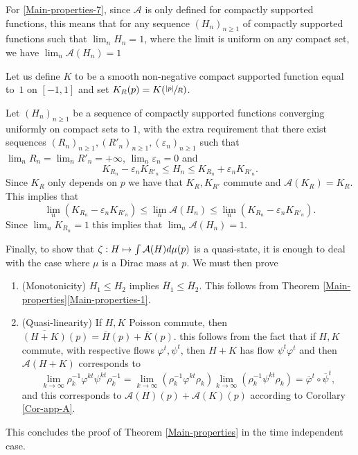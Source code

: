 \documentclass[JEP,XML,SOM,NoFloatCountersInSection,Unicode,published]{cedram}
\newcommand\mto{\mathchoice{\longmapsto}{\mapsto}{\mapsto}{\mapsto}}
\numberwithin{equation}{section}
\let \phi \varphi
\theoremstyle{plain}
\theoremstyle{definition}
\theoremstyle{remark}
\begin{document}
For \eqref{Main-properties-7}, since $\mathcal A$ is only defined for compactly supported functions, this means
that for any sequence $(H_n)_{n\geq 1}$ of compactly supported functions such that $\lim_n H_n=1$, where the limit is uniform on any compact set, we have $\lim_n \mathcal A (H_n)=1$

Let us define $K$ to be a smooth non-negative compact supported function equal to~$1$ on $[-1,1]$ and set $K_R(p)=K(\sfrac{ \vert p \vert }{R})$.

Let $(H_n)_{n\geq 1}$ be a sequence of compactly supported functions converging uniformly on compact sets to $1$, with the extra requirement that there exist sequences $(R_{n})_{n\geq 1}, (R'_{n})_{n\geq 1}, (\varepsilon_{n})_{n\geq 1}$ such that $\lim_{n}R_{n}=\lim_{n}R'_{n}=+\infty$, $\lim_{n} \varepsilon _{n}=0$ and
\[
K_{R_{n}}- \varepsilon_n K_{R'_{n}} \leq H_n \leq K_{R_n}+ \varepsilon_{n}K_{R'_{n}}.
\]
Since $K_R$ only depends on $p$ we have that $K_R,K_{R'}$ commute and ${\mathcal A}(K_R)=K_R$. This implies
that
\[
\lim_n(K_{R_n}- \varepsilon_nK_{R'_n})\leq \lim_n{\mathcal A}(H_n) \leq \lim_n(K_{R_n}- \varepsilon_nK_{R'_n}).
\]
Since $\lim_n K_{R_n}=1$ this implies that $\lim_n{\mathcal A}(H_n)=1$.

Finally, to show that $\zeta: H \mto \int \mathcal A (H) d\mu(p)$ is a quasi-state, it is enough to deal with the case where $\mu$ is a Dirac mass at $p$. We must then prove

\begin{enumerate}
\item (Monotonicity) $H_{1}\leq H_{2}$ implies $\overline H_{1} \leq \overline H_{2}$. This follows from Theorem \ref{Main-properties}\ref{Main-properties-1}.

\item (Quasi-linearity) If $H,K$ Poisson commute, then $\overline {(H+K)}(p)=\overline H (p) + \overline K(p)$. this follows from the fact that if $H,K$ commute, with respective flows $\phi^{t}, \psi^{t}$, then $H+K$ has flow $\psi^{t}\phi^{t}$ and then
${\mathcal A}(H+K)$ corresponds to
\[
\lim_{k\to \infty}\rho_{k}^{-1}\phi^{kt}\psi^{kt}\rho_{k}^{-1}= \lim_{k\to \infty}(\rho_{k}^{-1}\phi^{kt}\rho_{k})\lim_{k\to \infty}(\rho_{k}^{-1}\psi^{kt}\rho_{k})= \overline\varphi^t\circ \overline\psi^t,
\]
and this corresponds to ${\mathcal A}(H)(p)+ {\mathcal A}(K)(p)$ according to Corollary \ref{Cor-app-A}.
\end{enumerate}
This concludes the proof of Theorem \ref{Main-properties} in the time independent case.
\end{document}
